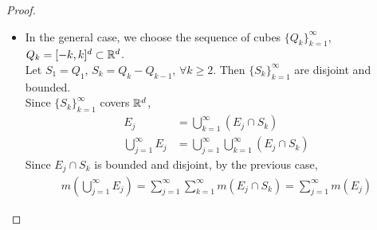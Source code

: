 \begin{thm}
\begin{proof}
\begin{itemize}
				\newpage
				
				\item In the general case, we choose the sequence of cubes $\{ Q_k \}_{k = 1}^{\infty}$, $Q_k = [-k , k]^d \subset \mathbb{R}^d$.\\
				Let $S_1 = Q_1$, $S_k = Q_k - Q_{k - 1}$, $\forall k \geq 2$. Then $\{ S_k \}_{k = 1}^{\infty}$ are disjoint and  bounded.\\
				Since $\{ S_k \}_{k = 1}^{\infty}$ covers $\mathbb{R}^d$,
				\begin{align}
					E_j &= \bigcup_{k = 1}^{\infty}{(E_j \cap S_k)} \\
					\bigcup_{j = 1}^{\infty}{E_j} &= \bigcup_{j = 1}^{\infty}\bigcup_{k = 1}^{\infty}{(E_j \cap S_k)}
				\end{align}
				Since $E_j \cap S_k$ is bounded and disjoint, by the previous case,
				\begin{align}
					m(\bigcup_{j = 1}^{\infty}{E_j}) = \sum_{j = 1}^{\infty}\sum_{k = 1}^{\infty}{m(E_j \cap S_k)} = \sum_{j = 1}^{\infty}{m(E_j)}
				\end{align}
			\end{itemize}
		\end{proof}
	\end{thm}
	
	\vspace{2em}
